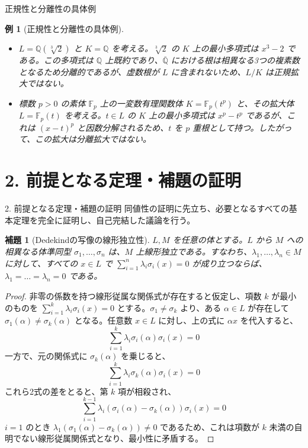 \documentclass[11pt,dvipsnames]{beamer}
\newtheorem{lem}[thm]{補題}
\newtheorem{ex}[thm]{例}
\begin{document}
\begin{frame}[allowframebreaks]{正規性と分離性の具体例}
    \begin{ex}[正規性と分離性の具体例]
        \begin{itemize}
            \item $L = \mathbb{Q}(\sqrt[3]{2})$ と $K = \mathbb{Q}$ を考える。$\sqrt[3]{2}$ の $K$ 上の最小多項式は $x^3 - 2$ である。この多項式は $\mathbb{Q}$ 上既約であり、$\overline{\mathbb{Q}}$ における根は相異なる3つの複素数となるため分離的であるが、虚数根が $L$ に含まれないため、$L/K$ は正規拡大ではない。
            \item 標数 $p > 0$ の素体 $\mathbb{F}_p$ 上の一変数有理関数体 $K = \mathbb{F}_p(t^p)$ と、その拡大体 $L = \mathbb{F}_p(t)$ を考える。$t \in L$ の $K$ 上の最小多項式は $x^p - t^p$ であるが、これは $(x-t)^p$ と因数分解されるため、$t$ を $p$ 重根として持つ。したがって、この拡大は分離拡大ではない。
        \end{itemize}
    \end{ex}
\end{frame}

\section{2. 前提となる定理・補題の証明}

\begin{frame}[allowframebreaks]{2. 前提となる定理・補題の証明}
    同値性の証明に先立ち、必要となるすべての基本定理を完全に証明し、自己完結した議論を行う。

    \begin{lem}[Dedekindの写像の線形独立性]
        $L, M$ を任意の体とする。$L$ から $M$ への相異なる体準同型 $\sigma_1, \dots, \sigma_n$ は、$M$ 上線形独立である。すなわち、$\lambda_1, \dots, \lambda_n \in M$ に対して、すべての $x \in L$ で $\sum_{i=1}^n \lambda_i \sigma_i(x) = 0$ が成り立つならば、$\lambda_1 = \dots = \lambda_n = 0$ である。
    \end{lem}
    
    \begin{proof}
        非零の係数を持つ線形従属な関係式が存在すると仮定し、項数 $k$ が最小のものを $\sum_{i=1}^k \lambda_i \sigma_i(x) = 0$ とする。$\sigma_1 \neq \sigma_k$ より、ある $\alpha \in L$ が存在して $\sigma_1(\alpha) \neq \sigma_k(\alpha)$ となる。任意数 $x \in L$ に対し、上の式に $\alpha x$ を代入すると、
        \[ \sum_{i=1}^k \lambda_i \sigma_i(\alpha) \sigma_i(x) = 0 \]
        一方で、元の関係式に $\sigma_k(\alpha)$ を乗じると、
        \[ \sum_{i=1}^k \lambda_i \sigma_k(\alpha) \sigma_i(x) = 0 \]
        これら2式の差をとると、第 $k$ 項が相殺され、
        \[ \sum_{i=1}^{k-1} \lambda_i (\sigma_i(\alpha) - \sigma_k(\alpha)) \sigma_i(x) = 0 \]
        $i=1$ のとき $\lambda_1(\sigma_1(\alpha) - \sigma_k(\alpha)) \neq 0$ であるため、これは項数が $k$ 未満の自明でない線形従属関係式となり、最小性に矛盾する。
    \end{proof}
\end{frame}
\end{document}
